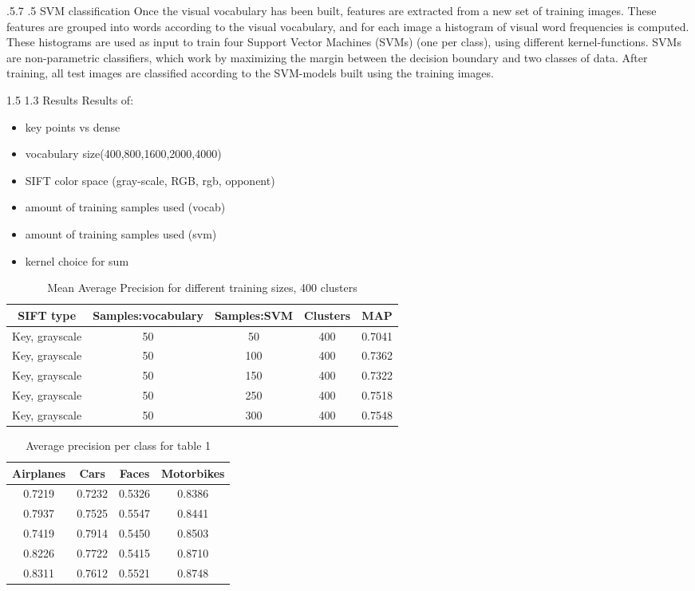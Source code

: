 \documentclass[12pt,a4paper]{amsart}
\makeatletter
\def\section{%
  \@startsection{section}{1}{\z@}%
  {1.5\linespacing\@plus\linespacing}%
  {1.3\linespacing}%
  {\bfseries\normalfont\scshape}
}
\def\subsection{\@startsection{subsection}{2}{\z@}%
  {.5\linespacing\@plus.7\linespacing}%
  {.5\linespacing}%
  {\small\normalfont}}
\makeatother
\begin{document}
\subsection{SVM classification}
Once the visual vocabulary has been built, features are extracted from a new set of training images. These features are grouped into words according to the visual vocabulary, and for each image a histogram of visual word frequencies is computed.
These histograms are used as input to train four Support Vector Machines (SVMs) (one per class), using different kernel-functions. SVMs are non-parametric classifiers, which work by maximizing the margin between the decision boundary and two classes of data.
After training, all test images are classified according to the SVM-models built using the training images. 

\section{Results}
Results of:\\
\begin{itemize}
\item key points vs dense
\item vocabulary size(400,800,1600,2000,4000)
\item SIFT color space (gray-scale, RGB, rgb, opponent)
\item amount of training samples used (vocab)
\item amount of training samples used (svm)
\item kernel choice for sum
\end{itemize}
\begin{table}[h!]
\centering
\begin{tabular}{ccccc}
SIFT type & Samples:vocabulary & Samples:SVM & Clusters & MAP\\
\toprule
Key, grayscale & 50 & 50 & 400 & 0.7041   \\
Key, grayscale & 50 & 100 & 400 & 0.7362\\
Key, grayscale & 50 & 150 & 400 &  0.7322\\
Key, grayscale & 50 & 250 & 400 &0.7518\\
Key, grayscale & 50 & 300 & 400 & 0.7548\\
\end{tabular}
\caption{Mean Average Precision for different training sizes, 400 clusters}
\label{tbl:refOfTable}
\end{table}
\begin{table}[h!]
\centering
\begin{tabular}{cccc}
Airplanes & Cars & Faces & Motorbikes\\
\toprule
0.7219&0.7232&0.5326&0.8386\\
0.7937&0.7525&0.5547&0.8441 \\
0.7419&0.7914&0.5450&0.8503\\
0.8226&0.7722&0.5415&0.8710\\
0.8311&0.7612&0.5521&0.8748\\
\end{tabular}
\caption{Average precision per class for table 1}
\label{tbl:refOfTable}
\end{table}
\end{document}
